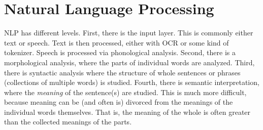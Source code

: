 \section{Natural Language Processing}\label{sec:nlp}

\gls{NLP} has different levels.
First, there is the input layer. This is commonly either text or speech. Text
is then processed, either with OCR or some kind of tokenizer. Speech is
processed via \gls{phonological} analysis. Second, there is a
\gls{morphological} analysis, where the parts of individual words are
analyzed. Third, there is \gls{syntactic} analysis where the structure of
whole sentences or phrases (collections of multiple words) is studied. Fourth,
there is \gls{semantic} interpretation, where the \textit{meaning} of the
sentence(s) are studied. This is much more difficult, because meaning can be
(and often is) divorced from the meanings of the individual words themselves.
That is, the meaning of the whole is often greater than the collected meanings
of the parts.
